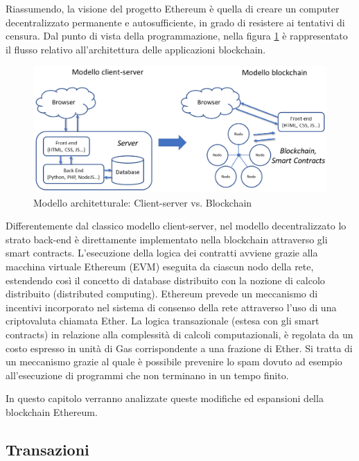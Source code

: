 Riassumendo, la visione del progetto Ethereum è quella di creare un computer decentralizzato permanente e autosufficiente, in grado di resistere ai tentativi di censura. Dal punto di vista della programmazione, nella figura \ref{fig:ArchitetturaBlockchain} è rappresentato il flusso relativo all’architettura delle applicazioni blockchain.

\begin{figure}[H]
\centering
\includegraphics[width=1\textwidth]{immagini/archit.png}
\caption{Modello architetturale: Client-server vs. Blockchain}
\label{fig:ArchitetturaBlockchain}
\end{figure}

Differentemente dal classico modello client-server, nel modello decentralizzato lo strato back-end è direttamente implementato nella blockchain attraverso gli smart contracts. L’esecuzione della logica dei contratti avviene grazie alla macchina virtuale Ethereum (EVM) eseguita da ciascun nodo della rete, estendendo così il concetto di database distribuito con la nozione di calcolo distribuito (distributed computing). Ethereum prevede un meccanismo di incentivi incorporato nel sistema di consenso della rete attraverso l’uso di una criptovaluta chiamata Ether. La logica transazionale (estesa con gli smart contracts) in relazione alla complessità di calcoli computazionali, è regolata da un costo espresso in unità di Gas corrispondente a una frazione di Ether. Si tratta di un meccanismo grazie al quale è possibile prevenire lo spam dovuto ad esempio all’esecuzione di programmi che non terminano in un tempo finito.

In questo capitolo verranno analizzate queste modifiche ed espansioni della blockchain Ethereum.

\subsection{Transazioni}

